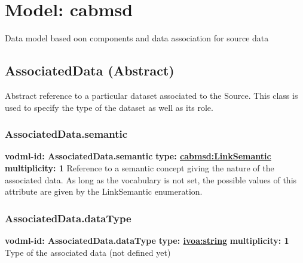 
%




\pagebreak
\section{Model: cabmsd }
  

  Data model based oon components and data association for source data

  \subsection{AssociatedData (Abstract)}
  \label{sect:AssociatedData}
    Abstract reference to a particular dataset associated to the Source. This class is used to specify the type of the dataset as well as its role.

    \subsubsection{AssociatedData.semantic}
      \textbf{vodml-id: AssociatedData.semantic} \newline
      \textbf{type: \hyperref[sect:LinkSemantic]{cabmsd:LinkSemantic}} \newline
      \textbf{multiplicity: 1} \newline 
      Reference to a semantic concept giving the nature of the associated data. As long as the vocabulary is not set, the possible values of this attribute are given by the LinkSemantic enumeration.

    \subsubsection{AssociatedData.dataType}
      \textbf{vodml-id: AssociatedData.dataType} \newline
      \textbf{type: \hyperref[sect:ivoa]{ivoa:string}} \newline
      \textbf{multiplicity: 1} \newline 
      Type of the associated data (not defined yet)

